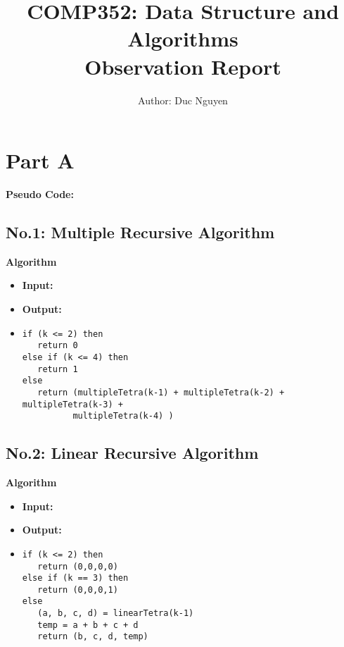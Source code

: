 \documentclass{article}
\title{COMP352: Data Structure and Algorithms
	\\ Observation Report}
\author{Author: Duc Nguyen}
\date{}
\begin{document}
\maketitle
\section*{Part A}%
\textbf{Pseudo Code:}

\subsection*{No.1: Multiple Recursive Algorithm}
\textbf{Algorithm }  
\begin{itemize}
	\item[]\textbf{Input: }  
	\item[]\textbf{Output: } 
\item[]\begin{verbatim}
if (k <= 2) then
   return 0
else if (k <= 4) then
   return 1
else 
   return (multipleTetra(k-1) + multipleTetra(k-2) + multipleTetra(k-3) +
          multipleTetra(k-4) )
\end{verbatim}

\end{itemize}

\subsection*{No.2: Linear Recursive Algorithm}
\textbf{Algorithm }  
\begin{itemize}
	\item[]\textbf{Input: }  
	\item[]\textbf{Output: }  
\item[]\begin{verbatim}
if (k <= 2) then
   return (0,0,0,0)
else if (k == 3) then
   return (0,0,0,1)
else 
   (a, b, c, d) = linearTetra(k-1)
   temp = a + b + c + d
   return (b, c, d, temp)
\end{verbatim}

\end{itemize}
\end{document}
